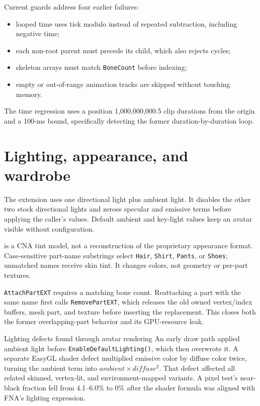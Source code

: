 Current guards address four earlier failures:

\begin{itemize}
  \item looped time uses tick modulo instead of repeated subtraction, including negative time;
  \item each non-root parent must precede its child, which also rejects cycles;
  \item skeleton arrays must match \texttt{BoneCount} before indexing;
  \item empty or out-of-range animation tracks are skipped without touching memory.
\end{itemize}

The time regression uses a position 1,000,000,000.5 clip durations from the origin and a
100-ms bound, specifically detecting the former duration-by-duration loop.

\section{Lighting, appearance, and wardrobe}

The extension uses one directional light plus ambient light. It disables the other two stock
directional lights and zeroes specular and emissive terms before applying the caller's values.
Default ambient and key-light values keep an avatar visible without configuration.

 is a CNA tint model, not a reconstruction of the proprietary
appearance format. Case-sensitive part-name substrings select \texttt{Hair}, \texttt{Shirt},
\texttt{Pants}, or \texttt{Shoes}; unmatched names receive skin tint. It changes colors, not
geometry or per-part textures.

\texttt{AttachPartEXT} requires a matching bone count. Reattaching a part with the same name
first calls \texttt{RemovePartEXT}, which releases the old owned vertex/index buffers, mesh
part, and texture before inserting the replacement. This closes both the former overlapping-part
behavior and its GPU-resource leak.

\begin{historynote}{Lighting defects found through avatar rendering}
An early draw path applied ambient light before \texttt{EnableDefaultLighting()}, which then
overwrote it. A separate EasyGL shader defect multiplied emissive color by diffuse color twice,
turning the ambient term into $ambient\times diffuse^2$. That defect affected all related
skinned, vertex-lit, and environment-mapped variants. A pixel test's near-black fraction fell
from 4.1--6.0\% to 0\% after the shader formula was aligned with FNA's lighting expression.
\end{historynote}

